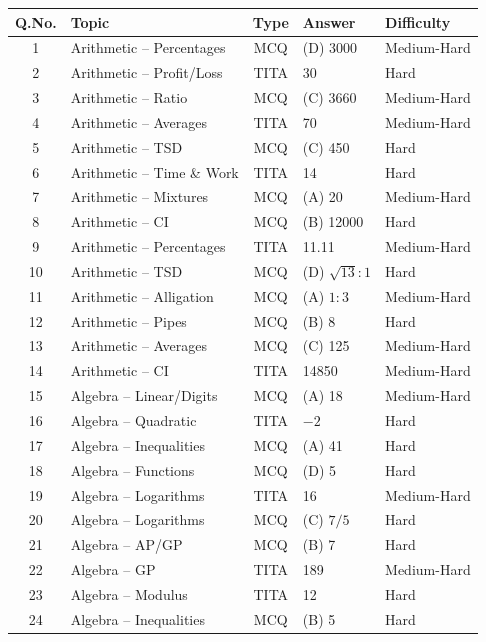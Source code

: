 \documentclass[11pt]{article}
\begin{document}
\begin{longtable}{|c|l|c|l|l|}
\hline
\textbf{Q.No.} & \textbf{Topic} & \textbf{Type} & \textbf{Answer} & \textbf{Difficulty} \\
\hline\hline
1 & Arithmetic -- Percentages & MCQ & (D) 3000 & Medium-Hard \\ \hline
2 & Arithmetic -- Profit/Loss & TITA & 30 & Hard \\ \hline
3 & Arithmetic -- Ratio & MCQ & (C) 3660 & Medium-Hard \\ \hline
4 & Arithmetic -- Averages & TITA & 70 & Medium-Hard \\ \hline
5 & Arithmetic -- TSD & MCQ & (C) 450 & Hard \\ \hline
6 & Arithmetic -- Time \& Work & TITA & 14 & Hard \\ \hline
7 & Arithmetic -- Mixtures & MCQ & (A) 20 & Medium-Hard \\ \hline
8 & Arithmetic -- CI & MCQ & (B) 12000 & Hard \\ \hline
9 & Arithmetic -- Percentages & TITA & 11.11 & Medium-Hard \\ \hline
10 & Arithmetic -- TSD & MCQ & (D) $\sqrt{13}:1$ & Hard \\ \hline
11 & Arithmetic -- Alligation & MCQ & (A) $1:3$ & Medium-Hard \\ \hline
12 & Arithmetic -- Pipes & MCQ & (B) 8 & Hard \\ \hline
13 & Arithmetic -- Averages & MCQ & (C) 125 & Medium-Hard \\ \hline
14 & Arithmetic -- CI & TITA & 14850 & Medium-Hard \\ \hline
15 & Algebra -- Linear/Digits & MCQ & (A) 18 & Medium-Hard \\ \hline
16 & Algebra -- Quadratic & TITA & $-2$ & Hard \\ \hline
17 & Algebra -- Inequalities & MCQ & (A) 41 & Hard \\ \hline
18 & Algebra -- Functions & MCQ & (D) 5 & Hard \\ \hline
19 & Algebra -- Logarithms & TITA & 16 & Medium-Hard \\ \hline
20 & Algebra -- Logarithms & MCQ & (C) $7/5$ & Hard \\ \hline
21 & Algebra -- AP/GP & MCQ & (B) 7 & Hard \\ \hline
22 & Algebra -- GP & TITA & 189 & Medium-Hard \\ \hline
23 & Algebra -- Modulus & TITA & 12 & Hard \\ \hline
24 & Algebra -- Inequalities & MCQ & (B) 5 & Hard \\ \hline

\end{longtable}
\end{document}
